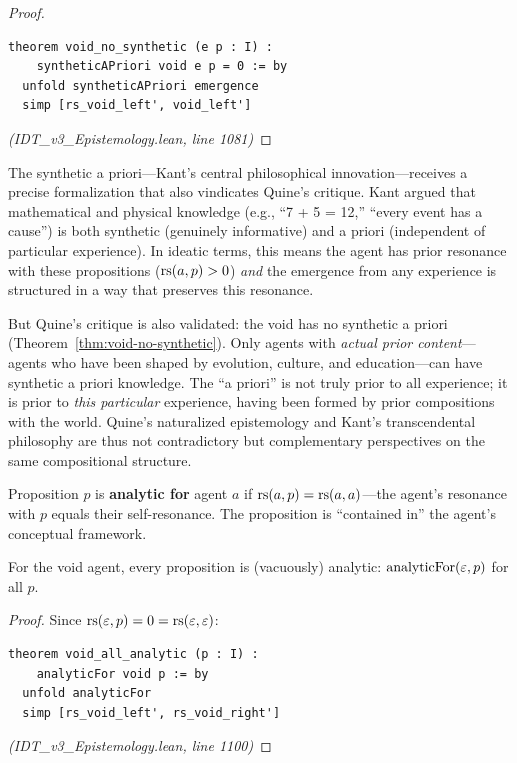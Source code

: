 \begin{proof}
\begin{lstlisting}
theorem void_no_synthetic (e p : I) :
    syntheticAPriori void e p = 0 := by
  unfold syntheticAPriori emergence
  simp [rs_void_left', void_left']
\end{lstlisting}
\textit{(IDT\_v3\_Epistemology.lean, line 1081)}
\end{proof}

\begin{interpretation}
The synthetic a priori---Kant's central philosophical innovation---receives a
precise formalization that also vindicates Quine's critique. Kant argued that
mathematical and physical knowledge (e.g., ``7 + 5 = 12,'' ``every event has
a cause'') is both synthetic (genuinely informative) and a priori (independent
of particular experience). In ideatic terms, this means the agent has prior
resonance with these propositions ($\mathrm{rs}(a, p) > 0$) \emph{and} the emergence
from any experience is structured in a way that preserves this resonance.

But Quine's critique is also validated: the void has no synthetic a priori
(Theorem~\ref{thm:void-no-synthetic}). Only agents with \emph{actual prior
content}---agents who have been shaped by evolution, culture, and education---can
have synthetic a priori knowledge. The ``a priori'' is not truly prior to all
experience; it is prior to \emph{this particular} experience, having been formed
by prior compositions with the world. Quine's naturalized epistemology and Kant's
transcendental philosophy are thus not contradictory but complementary perspectives
on the same compositional structure.
\end{interpretation}

\begin{definition}[Analyticity]
\label{def:analytic}
Proposition $p$ is \textbf{analytic for} agent $a$ if $\mathrm{rs}(a, p) = \mathrm{rs}(a, a)$---the
agent's resonance with $p$ equals their self-resonance. The proposition is
``contained in'' the agent's conceptual framework.
\end{definition}

\begin{theorem}
\label{thm:void-all-analytic}
For the void agent, every proposition is (vacuously) analytic:
$\mathrm{analyticFor}(\varepsilon, p)$ for all $p$.
\end{theorem}

\begin{proof}
Since $\mathrm{rs}(\varepsilon, p) = 0 = \mathrm{rs}(\varepsilon, \varepsilon)$:
\begin{lstlisting}
theorem void_all_analytic (p : I) :
    analyticFor void p := by
  unfold analyticFor
  simp [rs_void_left', rs_void_right']
\end{lstlisting}
\textit{(IDT\_v3\_Epistemology.lean, line 1100)}
\end{proof}


